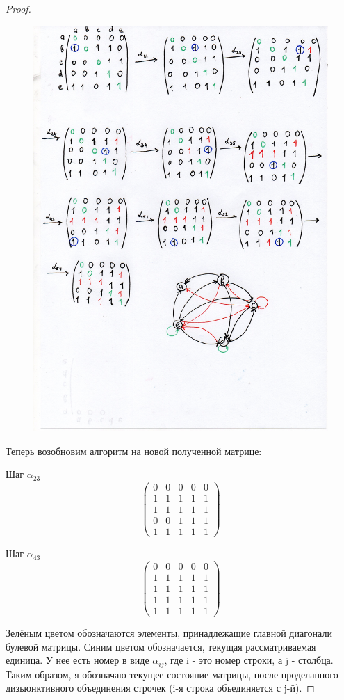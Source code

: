 \begin{proof}

    \begin{figure}[h]
     \includegraphics[width=0.634\linewidth]{pics/1thsolution.jpg}
     \label{fig:dm}
    \end{figure}

    Теперь возобновим алгоритм на новой полученной матрице:
    
    Шаг $\alpha_{23}$
    \[\begin{pmatrix}
        0 & 0 & 0 & 0 & 0\\
        1 & 1 & 1 & 1 & 1\\
        1 & 1 & 1 & 1 & 1\\
        0 & 0 & 1 & 1 & 1\\
        1 & 1 & 1 & 1 & 1
    \end{pmatrix}\]

     Шаг $\alpha_{43}$
    \[\begin{pmatrix}
        0 & 0 & 0 & 0 & 0\\
        1 & 1 & 1 & 1 & 1\\
        1 & 1 & 1 & 1 & 1\\
        1 & 1 & 1 & 1 & 1\\
        1 & 1 & 1 & 1 & 1
    \end{pmatrix}\]
    
 Зелёным цветом обозначаются элементы, принадлежащие главной диагонали булевой матрицы. Синим цветом обозначается, текущая рассматриваемая единица. У нее есть номер в виде $\alpha_{ij}$, где i - это номер строки, а j - столбца. Таким образом, я обозначаю текущее состояние матрицы, после проделанного дизьюнктивного объединения строчек (i-я строка объединяется с j-й).


\end{proof}
